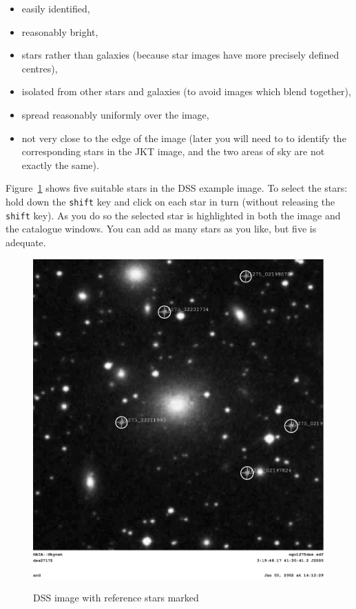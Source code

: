 \documentclass[twoside,11pt]{article}
\renewcommand{\_}{\texttt{\symbol{95}}}
\begin{document}
\begin{enumerate}
\begin{itemize}
    \item easily identified,

    \item reasonably bright,

    \item stars rather than galaxies (because star images have more
     precisely defined centres),

    \item isolated from other stars and galaxies (to avoid images which
     blend together),

    \item spread reasonably uniformly over the image,

    \item not very close to the edge of the image (later you will need to
     to identify the corresponding stars in the JKT image, and the two
     areas of sky are not exactly the same).

  \end{itemize}

   Figure~\ref{ASTROM_R_PAPER} shows five suitable stars in the DSS
   example image.  To select the stars: hold down the {\tt shift} key and
   click on each star in turn (without releasing the {\tt shift} key).  As
   you do so the selected star is highlighted in both the image and the
   catalogue windows.  You can add as many stars as you like, but five is
   adequate.

  \begin{figure}[htbp]
     \centering
     \includegraphics[totalheight=6in]{sc17_astrom_r_paper.ps}
     \begin{quote}
     \caption{DSS image with reference stars marked
     \label{ASTROM_R_PAPER} }
     \end{quote}
  \end{figure}


\end{enumerate}
\end{document}
